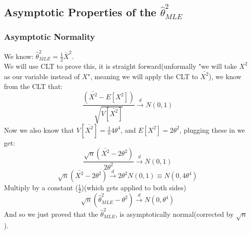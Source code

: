 \documentclass[12pt]{article}
\begin{document}
\subsection*{Asymptotic Properties of the $\hat{\theta}^2_{MLE}$}

\subsubsection*{Asymptotic Normality}
We know: $\hat{\theta}^2_{MLE} = \frac{1}{2}\bar{X}^2$. \\
We will use CLT to prove this, it is straight forward(unformally "we will take $X^2$ as our variable instead of $X$", meaning we will apply the CLT to $\bar{X^2}$), we know from the CLT that:
\[
\frac{(\bar{X^2}-E[X^2])}{\sqrt{V[\bar{X^2}]}} \xrightarrow{d} N(0,1)
\]
Now we also know that $V[\bar{X^2}] = \frac{1}{n}4\theta^4$, and $E[X^2] = 2\theta^2$, plugging these in we get: 
\[
\frac{\sqrt{n}(\bar{X^2}-2\theta^2)}{2\theta^2} \xrightarrow{d} N(0,1)
\]
\[
  \sqrt{n}(\bar{X^2}-2\theta^2) \xrightarrow{d} 2\theta^2N(0,1) \equiv N(0,4\theta^4)
\]
Multiply by a constant ($\frac{1}{2}$)(which gets applied to both sides)
\[
\sqrt{n}(\hat{\theta}^2_{MLE}-\theta^2) \xrightarrow{d} N(0,\theta^4)
\]
And so we just proved that the $\hat{\theta}^2_{MLE}$, is asymptotically normal(corrected by $\sqrt{n}$).\\
\end{document}
